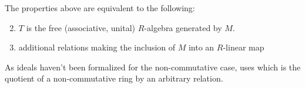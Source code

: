 \begin{remark}
    \label{mk:TensorAlgebra}

    The properties above are equivalent to the following:

    \begin{enumerate}
        \setcounter{enumi}{1}
        \item $T$ is the free (associative, unital) $R$-algebra generated by $M$.
        \item additional relations making the inclusion of $M$ into an $R$-linear map
    \end{enumerate}

    As ideals haven't been formalized for the non-commutative case, \Mathlib uses  which is
    the quotient of a non-commutative ring by an arbitrary relation.
    
\end{remark}